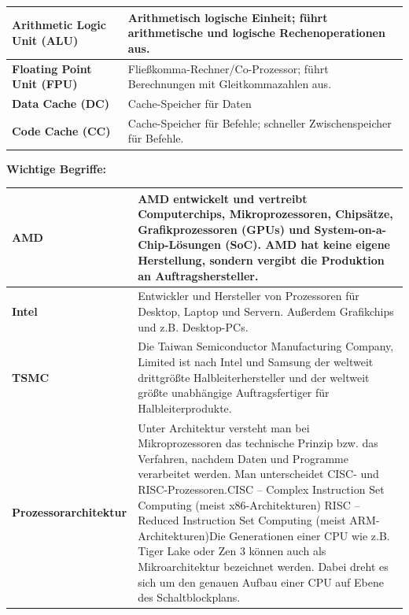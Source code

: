 \documentclass[10pt]{article}
\begin{document}
\begin{flushleft}
\begin{table}[H]
\begin{tabular}{|p{}|p{}|}
        \textbf{Arithmetic Logic Unit (ALU)} & Arithmetisch logische Einheit; führt arithmetische und logische Rechenoperationen aus.

        \\\hline

        \textbf{Floating Point Unit (FPU)} & Fließkomma-Rechner/Co-Prozessor; führt Berechnungen mit Gleitkommazahlen aus.

        \\\hline

        \textbf{Data Cache (DC)} & Cache-Speicher für Daten

        \\\hline

        \textbf{Code Cache (CC)} & Cache-Speicher für Befehle; schneller Zwischenspeicher für Befehle.

        \\\hline
    \end{tabular}
\end{table}

\break

\textbf{Wichtige Begriffe:}
\begin{longtable}{|p{}|p{}|}
        \hline

        \textbf{AMD} & AMD entwickelt und vertreibt Computerchips, Mikroprozessoren, Chipsätze, Grafikprozessoren (GPUs) und System-on-a-Chip-Lösungen (SoC).
        \newline AMD hat keine eigene Herstellung, sondern vergibt die Produktion an Auftragshersteller.

        \\\hline
        
        \textbf{Intel} & Entwickler und Hersteller von Prozessoren für Desktop, Laptop und Servern. Außerdem Grafikchips und z.B. Desktop-PCs.

        \\\hline

        \textbf{TSMC} & Die Taiwan Semiconductor Manufacturing Company, Limited ist nach Intel und Samsung der weltweit drittgrößte Halbleiterhersteller und der weltweit größte unabhängige Auftragsfertiger für Halbleiterprodukte.

        \\\hline

        \textbf{Prozessorarchitektur} & Unter Architektur versteht man bei Mikroprozessoren das technische Prinzip bzw. das Verfahren, nachdem Daten und Programme verarbeitet werden. Man unterscheidet CISC- und RISC-Prozessoren.CISC – Complex Instruction Set Computing (meist x86-Architekturen) RISC – Reduced Instruction Set Computing (meist ARM-Architekturen)Die Generationen einer CPU wie z.B. Tiger Lake oder Zen 3 können auch als Mikroarchitektur bezeichnet werden. Dabei dreht es sich um den genauen Aufbau einer CPU auf Ebene des Schaltblockplans.


\end{longtable}
\end{flushleft}
\end{document}
